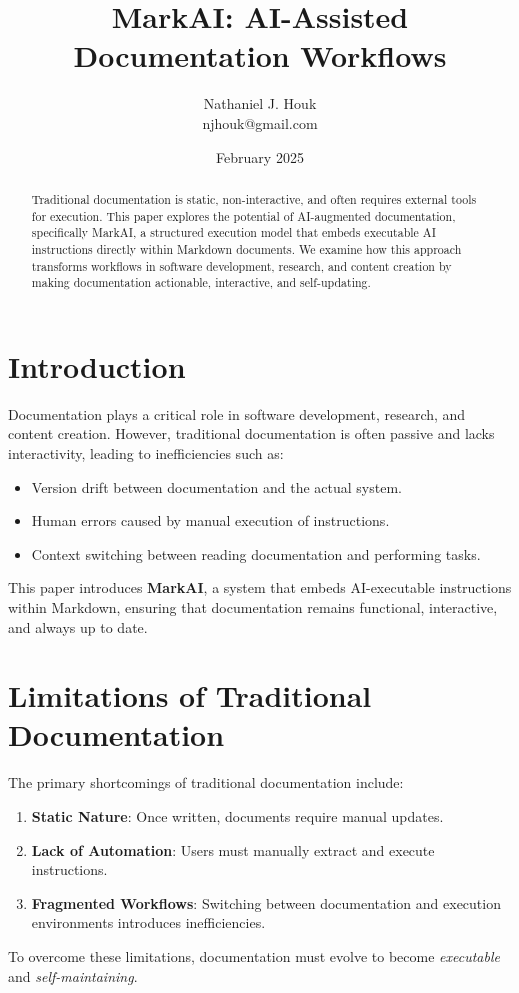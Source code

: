 \documentclass{article}
\title{MarkAI: AI-Assisted Documentation Workflows}
\author{Nathaniel J. Houk \\ njhouk@gmail.com}
\date{February 2025}
\begin{document}
\maketitle
\tableofcontents

\begin{abstract}
Traditional documentation is static, non-interactive, and often requires external tools for execution. This paper explores the potential of AI-augmented documentation, specifically MarkAI, a structured execution model that embeds executable AI instructions directly within Markdown documents. We examine how this approach transforms workflows in software development, research, and content creation by making documentation actionable, interactive, and self-updating.
\end{abstract}

\section{Introduction}
Documentation plays a critical role in software development, research, and content creation. However, traditional documentation is often passive and lacks interactivity, leading to inefficiencies such as:
\begin{itemize}
    \item Version drift between documentation and the actual system.
    \item Human errors caused by manual execution of instructions.
    \item Context switching between reading documentation and performing tasks.
\end{itemize}
This paper introduces \textbf{MarkAI}, a system that embeds AI-executable instructions within Markdown, ensuring that documentation remains functional, interactive, and always up to date.

\section{Limitations of Traditional Documentation}
The primary shortcomings of traditional documentation include:
\begin{enumerate}
    \item \textbf{Static Nature}: Once written, documents require manual updates.
    \item \textbf{Lack of Automation}: Users must manually extract and execute instructions.
    \item \textbf{Fragmented Workflows}: Switching between documentation and execution environments introduces inefficiencies.
\end{enumerate}
To overcome these limitations, documentation must evolve to become \textit{executable} and \textit{self-maintaining}.
\end{document}
